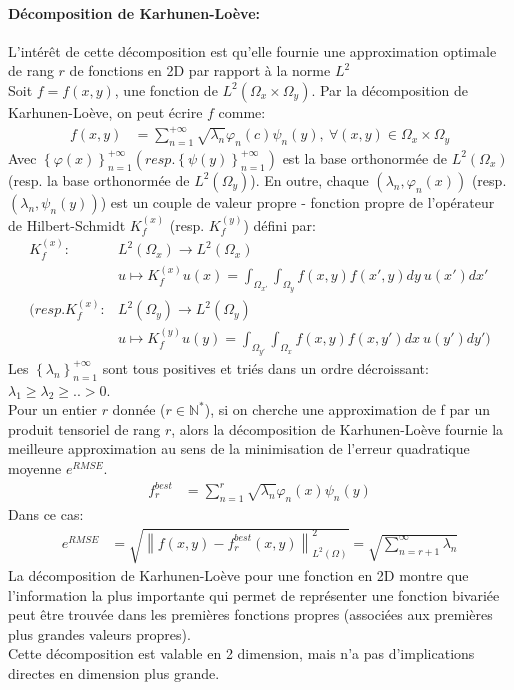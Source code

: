 \paragraph{Décomposition de Karhunen-Loève:\\}
\hspace{0.5cm} L'intérêt de cette décomposition est qu'elle fournie une approximation optimale de rang $r$ de fonctions en 2D par rapport à la norme $L^2$\\
Soit $f=f(x,y)$, une fonction de $L^2(\Omega_x \times \Omega_y)$. Par la décomposition de Karhunen-Loève, on peut écrire $f$ comme:
\begin{align}
		f(x,y) &= \sum_{n=1}^{+\infty} \sqrt{\lambda_n} \varphi_n(c)\psi_n(y),\ \forall(x,y) \in\Omega_x \times \Omega_y
\end{align}
Avec $\left \{ \varphi(x) \right \}_{n=1}^{+\infty} (resp. \left \{ \psi(y) \right \}_{n=1}^{+\infty})$ est la base orthonormée de $L^2(\Omega_x)$ (resp. la base orthonormée de $L^2(\Omega_y)$).
En outre, chaque $(\lambda_n,\varphi_n(x))$ (resp. $(\lambda_n,\psi_n(y))$) est un couple de valeur propre - fonction propre de l'opérateur de Hilbert-Schmidt $K_f^{(x)}$ (resp. $K_f^{(y)}$)
défini par:
\begin{align}
						K_f^{(x)} :	& L^2(\Omega_x) \rightarrow L^2(\Omega_x) \\
												&	u \mapsto K_f^{(x)} u(x) = \int_{\Omega_{x'}} \int_{\Omega_{y}} f(x,y) f(x',y)dy\ u(x')dx' \\
		(resp. K_f^{(x)} :	& L^2(\Omega_y) \rightarrow L^2(\Omega_y) \\
												&	u \mapsto K_f^{(y)} u(y) = \int_{\Omega_{y'}} \int_{\Omega_{x}} f(x,y) f(x,y')dx\ u(y')dy' )
\end{align}
Les $\left \{\lambda_n \right \}_{n=1}^{+\infty}$ sont tous positives et triés dans un ordre décroissant: $\lambda_1 \geq \lambda_2 \geq .. > 0$.\\
Pour un entier $r$ donnée ($r\in\mathbb{N}^{*}$), si on cherche une approximation de f par un produit tensoriel de rang $r$, alors la décomposition de Karhunen-Loève
fournie la meilleure approximation au sens de la minimisation de l'erreur quadratique moyenne $e^{RMSE}$.
\begin{align}
		f_r^{best} & = \sum_{n=1}^r \sqrt{\lambda_n} \varphi_n(x) \psi_n(y)
\end{align}
Dans ce cas:
\begin{align}
		e^{RMSE} &= \sqrt{ \left \| f(x,y) - f_r^{best}(x,y) \right \|_{L^2(\Omega)}^2} = \sqrt{\sum_{n=r+1}^{\infty} \lambda_n}
\end{align}
La décomposition de Karhunen-Loève pour une fonction en 2D montre que l'information la plus importante qui permet de représenter une fonction bivariée peut être
trouvée dans les premières fonctions propres (associées aux premières plus grandes valeurs propres). \\
Cette décomposition est valable en 2 dimension, mais n'a pas d'implications directes en dimension plus grande.

